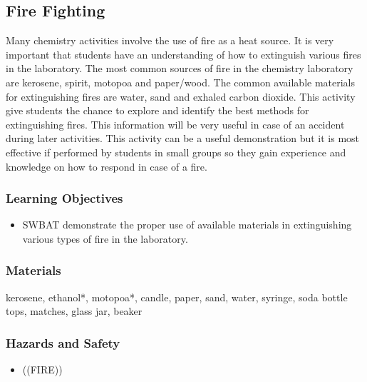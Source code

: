 \subsection{Fire Fighting}
Many chemistry activities involve the use of fire as a heat source. It is very important that students have an understanding of how to extinguish various fires in the laboratory. The most common sources of fire in the chemistry laboratory are kerosene, spirit, motopoa and paper/wood. The common available materials for extinguishing fires are water, sand and exhaled carbon dioxide. This activity give students the chance to explore and identify the best methods for extinguishing fires. This information will be very useful in case of an accident during later activities. This activity can be a useful demonstration but it is most effective if performed by students in small groups so they gain experience and knowledge on how to respond in case of a fire.
\subsubsection*{Learning Objectives}
\begin{itemize}
\item{SWBAT demonstrate the proper use of available materials in extinguishing various types of fire in the laboratory.}
\end{itemize}

\subsubsection*{Materials}
kerosene, ethanol*, motopoa*, candle, paper, sand, water, syringe, soda bottle tops, matches, glass jar, beaker

\subsubsection*{Hazards and Safety}
\begin{itemize}
\item{((FIRE))}
\end{itemize}

